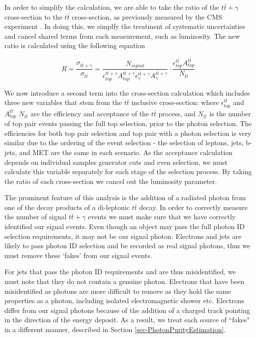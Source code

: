In order to simplify the calculation, we are able to take the ratio of the $t\bar{t}+\gamma$ cross-section to the $t\bar{t}$ cross-section, as previously measured by the CMS experiment \cite{ttbarXsectiondilepton}. In doing this, we simplfy the treatment of systematic uncertainties and cancel shared terms from each measurement, such as luminosity. The new ratio is calculated using the following equation

\begin{equation}
R = \frac{\sigma_{t\bar{t}+\gamma}}{\sigma_{t\bar{t}}} = \frac{N_{signal}}{\epsilon^{t\bar{t}+\gamma}_{top} A^{t\bar{t}+\gamma}_{top} 
\epsilon^{t\bar{t}+\gamma}_{\gamma} A^{t\bar{t}+\gamma}_{\gamma}} \cdot \frac{\epsilon^{t\bar{t}}_{top} A^{t\bar{t}}_{top}}{N_{t\bar{t}}}
\end{equation}

We now introduce a second term into the cross-section calculation which includes three new variables that stem from the $t\bar{t}$ inclusive cross-section: where $\epsilon^{t\bar{t}}_{top}$ and $A^{t\bar{t}}_{top}$ $N_{t\bar{t}}$ are the efficiency and acceptance of the $t\bar{t}$ process, and $N_{t\bar{t}}$ is the number of top pair events passing the full top selection, prior to the photon selection. The efficiencies for both top pair selection and top pair with a photon selection is very similar due to the ordering of the event selection - the selection of leptons, jets, b-jets, and MET are the same in each scenario. As the acceptance calculation depends on individual samples generator cuts and even selection, we must calculate this variable separately for each stage of the selection process. By taking the ratio of each cross-section we cancel out the luminosity parameter.

The prominent feature of this analysis is the addition of a radiated photon from one of the decay products of a di-leptonic $t\bar{t}$ decay. In order to correctly measure the number of signal $t\bar{t}+\gamma$ events we must make sure that we have correctly identified our signal events. Even though an object may pass the full photon ID selection requirements, it may not be our signal photon. Electrons and jets are likely to pass photon ID selection and be recorded as real signal photons, thus we must remove these `fakes' from our signal events.

For jets that pass the photon ID requirements and are thus misidentified, we must note that they do not contain a genuine photon. Electrons that have been misidentified as photons are more difficult to remove as they hold the same properties as a photon, including isolated electromagnetic shower etc. Electrons differ from our signal photons because of the addition of a charged track pointing in the direction of the energy deposit. As a result, we treat each source of ``fakes" in a different manner, described in Section \ref{sec-PhotonPurityEstimation}.   



